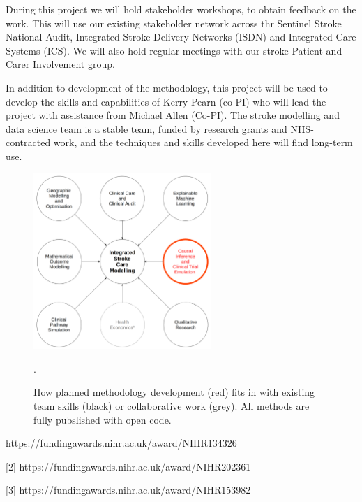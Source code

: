 \begin{markdown}
During this project we will hold stakeholder workshops, to obtain feedback on the work. This will use our existing stakeholder network across thr Sentinel Stroke National Audit, Integrated Stroke Delivery Networks (ISDN) and Integrated Care Systems (ICS). We will also hold regular meetings with our stroke Patient and Carer Involvement group.

In addition to development of the methodology, this project will be used to develop the skills and capabilities of Kerry Pearn (co-PI) who will lead the project with assistance from Michael Allen (Co-PI). The stroke modelling and data science team is a stable team, funded by research grants and NHS-contracted work, and the techniques and skills developed here will find long-term use.

\end{markdown}

\begin{figure}[h]
\centering
\includegraphics[width=0.6\textwidth]{./images/expertise}
\caption{How planned methodology development (red) fits in with existing team skills (black) or collaborative work (grey). All methods are fully pubslished with open code.}.
\label{fig:expertise}
\end{figure}

\begin{markdown}
[1] https://fundingawards.nihr.ac.uk/award/NIHR134326

[2] https://fundingawards.nihr.ac.uk/award/NIHR202361

[3] https://fundingawards.nihr.ac.uk/award/NIHR153982
\end{markdown}